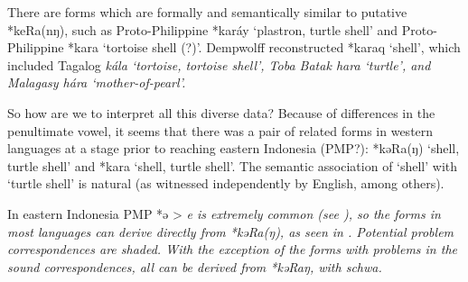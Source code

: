 There are forms which are formally
and semantically similar to putative *keRa(nŋ),
such as Proto-Philippine *karáy ‘plastron,
turtle shell’ and Proto-Philippine *kara ‘tortoise shell (?)’.
Dempwolff reconstructed *karaq ‘shell’,
which included Tagalog \it{kála} ‘tortoise,
tortoise shell’, Toba Batak \it{hara} ‘turtle’,
and Malagasy \it{hára} ‘mother-of-pearl’.

So how are we to interpret all this diverse data? Because of
differences in the penultimate vowel,
it seems that there was a pair of related forms in western languages
at a stage prior to reaching eastern Indonesia (PMP?): *kəRa(ŋ)
‘shell, turtle shell’ and *kara ‘shell, turtle shell’.
The semantic association of ‘shell’ with ‘turtle shell’ is natural
(as witnessed independently by English, among others).

In eastern Indonesia PMP *ə > \it{e} is extremely common (see
), so the forms in most languages can derive directly from *kəRa(ŋ),
as seen in .
Potential problem correspondences are shaded.
With the exception of the forms with problems in the sound correspondences,
all can be derived from *kəRaŋ, with schwa.

